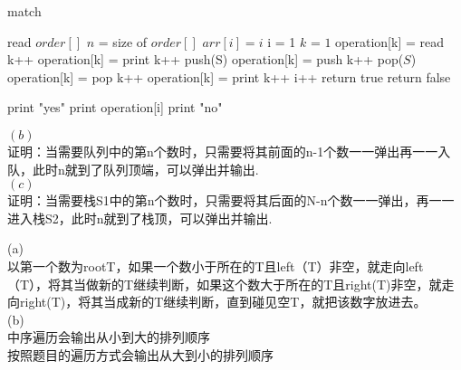 \documentclass[a4paper, justified]{tufte-handout}
\begin{document}
\begin{solution}
  \noindent
  \begin{algorithm}
    \caption{match}\label{euclid}
    \begin{algorithmic}[2]
      \State read {$order[]$}
      \State $n$ = size of $order[]$
      \State $arr[i] = i$
      \EndFor
      \State i = 1
      \State $k$ = $1$
      \State operation[k] = read
      \State k++
      \State operation[k] = print
      \State k++
      \Else
      \State push(S)
      \State operation[k] = push
      \State k++
      \EndIf
      \State pop($S$)
      \State operation[k] = pop
      \State k++
      \State operation[k] = print
      \State k++
      \State i++
      \EndIf
      \EndFor
      \State return true
      \Else return false
      \EndIf
      \EndProcedure

      \State print "yes"
      \State print operation[i]
      \EndFor
      \Else
      \State print "no"
      \EndIf
    \end{algorithmic}
  \end{algorithm}
\end{solution}

\begin{problem}
\end{problem}

\begin{solution}
  $(b)$\\
  证明：当需要队列中的第n个数时，只需要将其前面的n-1个数一一弹出再一一入队，此时n就到了队列顶端，可以弹出并输出.\\
  $(c)$\\
  证明：当需要栈S1中的第n个数时，只需要将其后面的N-n个数一一弹出，再一一进入栈S2，此时n就到了栈顶，可以弹出并输出.\\
\end{solution}

\begin{problem}[DH 2.16: Treesort]
\end{problem}

\begin{solution}
  \noindent
  (a)\\
  以第一个数为rootT，如果一个数小于所在的T且left（T）非空，就走向left（T），将其当做新的T继续判断，如果这个数大于所在的T且right(T)非空，就走向right(T)，将其当成新的T继续判断，直到碰见空T，就把该数字放进去。\\
  (b)\\
  中序遍历会输出从小到大的排列顺序\\
  按照题目的遍历方式会输出从大到小的排列顺序

\end{solution}
\end{document}
